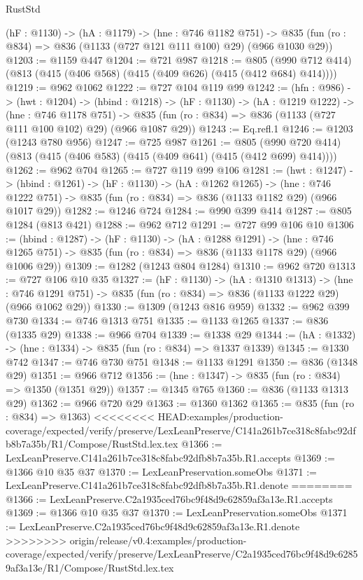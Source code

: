 \begin{lexlean}{RustStd}
\begin{coremodule}
{\begin{coremodule}
  (hF : @1130) ->
  (hA : @1179) ->
  (hne : @746 @1182 @751) ->
  @835 (fun (ro : @834) => @836 (@1133 (@727 @121 @111 @100) @29) (@966 @1030 @29))
@1203 := @1159 @447
@1204 := @721 @987
@1218 := @805 (@990 @712 @414) (@813 (@415 (@406 @568) (@415 (@409 @626) (@415 (@412 @684) @414))))
@1219 := @962 @1062
@1222 := @727 @104 @119 @99
@1242 := (hfn : @986) ->
  (hwt : @1204) ->
  (hbind : @1218) ->
  (hF : @1130) ->
  (hA : @1219 @1222) ->
  (hne : @746 @1178 @751) ->
  @835 (fun (ro : @834) => @836 (@1133 (@727 @111 @100 @102) @29) (@966 @1087 @29))
@1243 := Eq.refl.{1}
@1246 := @1203 (@1243 @780 @956)
@1247 := @725 @987
@1261 := @805 (@990 @720 @414) (@813 (@415 (@406 @583) (@415 (@409 @641) (@415 (@412 @699) @414))))
@1262 := @962 @704
@1265 := @727 @119 @99 @106
@1281 := (hwt : @1247) ->
  (hbind : @1261) ->
  (hF : @1130) ->
  (hA : @1262 @1265) ->
  (hne : @746 @1222 @751) -> @835 (fun (ro : @834) => @836 (@1133 @1182 @29) (@966 @1017 @29))
@1282 := @1246 @724
@1284 := @990 @399 @414
@1287 := @805 @1284 (@813 @421)
@1288 := @962 @712
@1291 := @727 @99 @106 @10
@1306 := (hbind : @1287) ->
  (hF : @1130) ->
  (hA : @1288 @1291) ->
  (hne : @746 @1265 @751) -> @835 (fun (ro : @834) => @836 (@1133 @1178 @29) (@966 @1006 @29))
@1309 := @1282 (@1243 @804 @1284)
@1310 := @962 @720
@1313 := @727 @106 @10 @35
@1327 := (hF : @1130) ->
  (hA : @1310 @1313) ->
  (hne : @746 @1291 @751) -> @835 (fun (ro : @834) => @836 (@1133 @1222 @29) (@966 @1062 @29))
@1330 := @1309 (@1243 @816 @959)
@1332 := @962 @399 @730
@1334 := @746 @1313 @751
@1335 := @1133 @1265
@1337 := @836 (@1335 @29)
@1338 := @966 @704
@1339 := @1338 @29
@1344 := (hA : @1332) -> (hne : @1334) -> @835 (fun (ro : @834) => @1337 @1339)
@1345 := @1330 @742
@1347 := @746 @730 @751
@1348 := @1133 @1291
@1350 := @836 (@1348 @29)
@1351 := @966 @712
@1356 := (hne : @1347) -> @835 (fun (ro : @834) => @1350 (@1351 @29))
@1357 := @1345 @765
@1360 := @836 (@1133 @1313 @29)
@1362 := @966 @720 @29
@1363 := @1360 @1362
@1365 := @835 (fun (ro : @834) => @1363)
<<<<<<<< HEAD:examples/production-coverage/expected/verify/preserve/LexLeanPreserve/C141a261b7ce318c8fabc92dfb8b7a35b/R1/Compose/RustStd.lex.tex
@1366 := LexLeanPreserve.C141a261b7ce318c8fabc92dfb8b7a35b.R1.accepts
@1369 := @1366 @10 @35 @37
@1370 := LexLeanPreservation.someObs
@1371 := LexLeanPreserve.C141a261b7ce318c8fabc92dfb8b7a35b.R1.denote
========
@1366 := LexLeanPreserve.C2a1935ced76bc9f48d9c62859af3a13e.R1.accepts
@1369 := @1366 @10 @35 @37
@1370 := LexLeanPreservation.someObs
@1371 := LexLeanPreserve.C2a1935ced76bc9f48d9c62859af3a13e.R1.denote
>>>>>>>> origin/release/v0.4:examples/production-coverage/expected/verify/preserve/LexLeanPreserve/C2a1935ced76bc9f48d9c62859af3a13e/R1/Compose/RustStd.lex.tex

\end{coremodule}}
\end{coremodule}
\end{lexlean}
